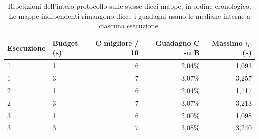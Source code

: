 \begin{table}[!htbp]
\centering\small
\caption{Ripetizioni dell'intero protocollo sulle stesse dieci mappe, in ordine cronologico. Le mappe indipendenti rimangono dieci; i guadagni usano le mediane interne a ciascuna esecuzione.}\label{tab:replicas}
\begin{tabular}{llrrr}
\toprule
Esecuzione & Budget (s) & C migliore / 10 & Guadagno C su B & Massimo $t_C$ (s)\\
\midrule
1 & 1 & 6 & 2{,}04\% & 1{,}093\\
1 & 3 & 7 & 3{,}07\% & 3{,}257\\
2 & 1 & 6 & 2{,}04\% & 1{,}117\\
2 & 3 & 7 & 3{,}07\% & 3{,}213\\
3 & 1 & 6 & 2{,}00\% & 1{,}098\\
3 & 3 & 7 & 3{,}08\% & 3{,}240\\
\bottomrule
\end{tabular}
\end{table}
